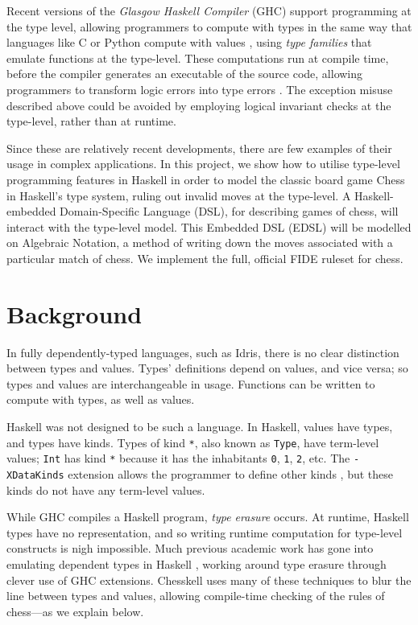 \documentclass[12pt, a4paper, bibliography=totocnumbered]{scrartcl}
\begin{document}
Recent versions of the \emph{Glasgow Haskell Compiler} (GHC) support programming at the type level, allowing programmers to compute with types in the same way that languages like C or Python compute with values \cite{yorgey2012giving}, using \emph{type families} \cite{opentfs} \cite{closedtfs} that emulate functions at the type-level. These computations run at compile time, before the compiler generates an executable of the source code, allowing programmers to transform logic errors into type errors \cite{twt}. The exception misuse described above could be avoided by employing logical invariant checks at the type-level, rather than at runtime.

Since these are relatively recent developments, there are few examples of their usage in complex applications. In this project, we show how to utilise type-level programming features in Haskell in order to model the classic board game Chess in Haskell's type system, ruling out invalid moves at the type-level. A Haskell-embedded Domain-Specific Language (DSL), for describing games of chess, will interact with the type-level model. This Embedded DSL (EDSL) will be modelled on Algebraic Notation, a method of writing down the moves associated with a particular match of chess. We implement the full, official FIDE ruleset for chess.

\section{Background}

In fully dependently-typed languages, such as Idris, there is no clear distinction between types and values. Types' definitions depend on values, and vice versa; so types and values are interchangeable in usage. Functions can be written to compute with types, as well as values.

Haskell was not designed to be such a language. In Haskell, values have types, and types have kinds. Types of kind \lstinline[basicstyle=\ttfamily]{*}, also known as \lstinline[basicstyle=\ttfamily]{Type}, have term-level values; \lstinline[basicstyle=\ttfamily]{Int} has kind \lstinline[basicstyle=\ttfamily]{*} because it has the inhabitants \lstinline[basicstyle=\ttfamily]{0}, \lstinline[basicstyle=\ttfamily]{1}, \lstinline[basicstyle=\ttfamily]{2}, etc. The \lstinline[basicstyle=\ttfamily]{-XDataKinds} extension allows the programmer to define other kinds \cite{yorgey2012giving}, but these kinds do not have any term-level values.

While GHC compiles a Haskell program, \emph{type erasure} occurs. At runtime, Haskell types have no representation, and so writing runtime computation for type-level constructs is nigh impossible. Much previous academic work has gone into emulating dependent types in Haskell \cite{singletons}, working around type erasure through clever use of GHC extensions. Chesskell uses many of these techniques to blur the line between types and values, allowing compile-time checking of the rules of chess---as we explain below.
\end{document}
